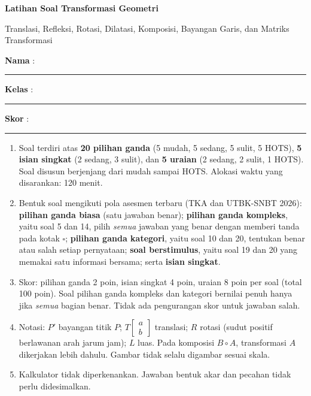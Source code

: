\documentclass[a4paper,11pt]{article}
\newcommand{\sm}[1]{\left[\begin{smallmatrix}#1\end{smallmatrix}\right]}
\newcounter{no}
\begin{document}
\thispagestyle{fancy}

\begin{center}
  {\color{redx}\fontsize{22}{26}\selectfont\bfseries Latihan Soal Transformasi Geometri\par}
  \vspace{2pt}
  {\color{pinkx}\large Translasi, Refleksi, Rotasi, Dilatasi, Komposisi, Bayangan Garis, dan Matriks Transformasi\par}
\end{center}
\vspace{2pt}
\begin{tcolorbox}[colback=softbg,colframe=redx!40,boxrule=0.6pt,arc=3pt,left=8pt,right=8pt,top=5pt,bottom=5pt]
\noindent\textbf{Nama} : \rule{4.6cm}{0.4pt}\hfill\textbf{Kelas} : \rule{2.2cm}{0.4pt}\hfill\textbf{Skor} : \rule{2.2cm}{0.4pt}
\end{tcolorbox}
\vspace{2pt}
\begin{tcolorbox}[colback=white,colframe=pinkx,boxrule=0.8pt,arc=3pt,left=8pt,right=8pt,top=4pt,bottom=4pt,title={\bfseries Petunjuk Pengerjaan},coltitle=white,fonttitle=\small]
\small
\begin{enumerate}[leftmargin=1.4em,itemsep=1pt,topsep=1pt]
\item Soal terdiri atas \textbf{20 pilihan ganda} (5 mudah, 5 sedang, 5 sulit, 5 HOTS), \textbf{5 isian singkat} (2 sedang, 3 sulit), dan \textbf{5 uraian} (2 sedang, 2 sulit, 1 HOTS). Soal disusun berjenjang dari mudah sampai HOTS. Alokasi waktu yang disarankan: 120 menit.
\item Bentuk soal mengikuti pola asesmen terbaru (TKA dan UTBK-SNBT 2026): \textbf{pilihan ganda biasa} (satu jawaban benar); \textbf{pilihan ganda kompleks}, yaitu soal 5 dan 14, pilih \emph{semua} jawaban yang benar dengan memberi tanda pada kotak $\square$; \textbf{pilihan ganda kategori}, yaitu soal 10 dan 20, tentukan benar atau salah setiap pernyataan; \textbf{soal berstimulus}, yaitu soal 19 dan 20 yang memakai satu informasi bersama; serta \textbf{isian singkat}.
\item Skor: pilihan ganda 2 poin, isian singkat 4 poin, uraian 8 poin per soal (total 100 poin). Soal pilihan ganda kompleks dan kategori bernilai penuh hanya jika \emph{semua} bagian benar. Tidak ada pengurangan skor untuk jawaban salah.
\item Notasi: $P'$ bayangan titik $P$; $T\sm{a\\b}$ translasi; $R$ rotasi (sudut positif berlawanan arah jarum jam); $L$ luas. Pada komposisi $B\circ A$, transformasi $A$ dikerjakan lebih dahulu. Gambar tidak selalu digambar sesuai skala.
\item Kalkulator tidak diperkenankan. Jawaban bentuk akar dan pecahan tidak perlu didesimalkan.
\end{enumerate}
\end{tcolorbox}
\end{document}
